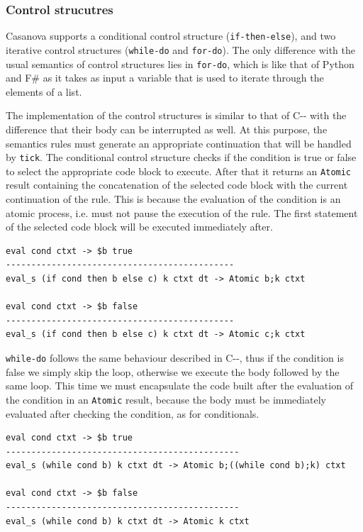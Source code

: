 \subsubsection{Control strucutres}
Casanova supports a conditional control structure (\texttt{if-then-else}), and two iterative control structures (\texttt{while-do} and \texttt{for-do}). The only difference with the usual semantics of control structures lies in \texttt{for-do}, which is like that of Python and F\# as it takes as input a variable that is used to iterate through the elements of a list.

The implementation of the control structures is similar to that of C-{}- with the difference that their body can be interrupted as well. At this purpose, the semantics rules must generate an appropriate continuation that will be handled by \texttt{tick}. The conditional control structure checks if the condition is true or false to select the appropriate code block to execute. After that it returns an \texttt{Atomic} result containing the concatenation of the selected code block with the current continuation of the rule. This is because the evaluation of the condition is an atomic process, i.e. must not pause the execution of the rule. The first statement of the selected code block will be executed immediately after.

\begin{lstlisting}
eval cond ctxt -> $b true
---------------------------------------------
eval_s (if cond then b else c) k ctxt dt -> Atomic b;k ctxt

eval cond ctxt -> $b false
---------------------------------------------
eval_s (if cond then b else c) k ctxt dt -> Atomic c;k ctxt
\end{lstlisting}

\noindent
\texttt{while-do} follows the same behaviour described in C-{}-, thus if the condition is false we simply skip the loop, otherwise we execute the body followed by the same loop. This time we must encapsulate the code built after the evaluation of the condition in an \texttt{Atomic} result, because the body must be immediately evaluated after checking the condition, as for conditionals.

\begin{lstlisting}
eval cond ctxt -> $b true
----------------------------------------------
eval_s (while cond b) k ctxt dt -> Atomic b;((while cond b);k) ctxt

eval cond ctxt -> $b false
----------------------------------------------
eval_s (while cond b) k ctxt dt -> Atomic k ctxt
\end{lstlisting}

